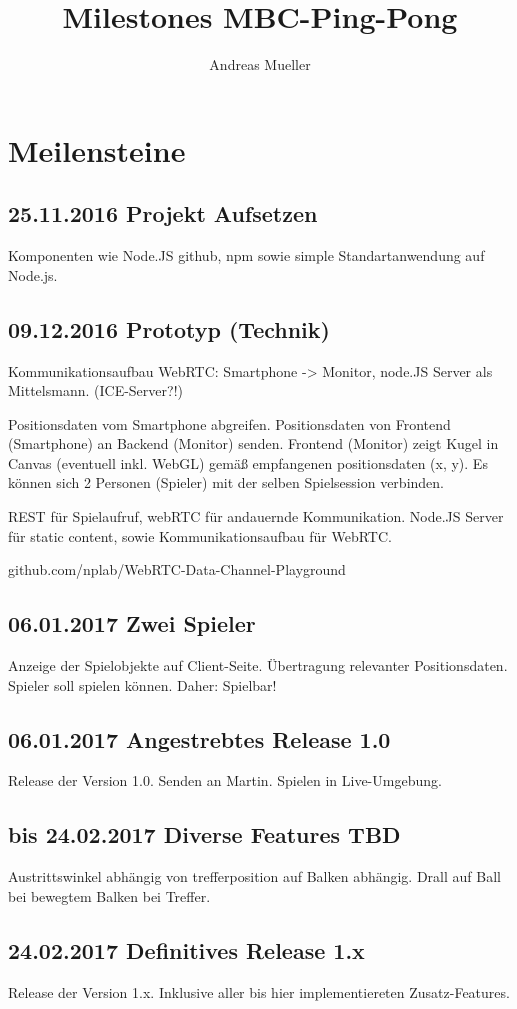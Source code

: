 \documentclass[12pt,a4paper]{article}
\author{Andreas Mueller}
\title{Milestones MBC-Ping-Pong}
\begin{document}
\maketitle
\newpage
\tableofcontents
\newpage

\section{Meilensteine}
\subsection{25.11.2016 Projekt Aufsetzen}
Komponenten wie Node.JS github, npm sowie simple Standartanwendung auf Node.js.

\subsection{09.12.2016 Prototyp (Technik)}
Kommunikationsaufbau WebRTC: Smartphone -> Monitor, node.JS Server als Mittelsmann. (ICE-Server?!)

Positionsdaten vom Smartphone abgreifen.
Positionsdaten von Frontend (Smartphone) an Backend (Monitor) senden.
Frontend (Monitor) zeigt Kugel in Canvas (eventuell inkl. WebGL) gemäß empfangenen positionsdaten (x, y).
Es können sich 2 Personen (Spieler) mit der selben Spielsession verbinden.

REST für Spielaufruf, webRTC für andauernde Kommunikation.
Node.JS Server für static content, 
sowie Kommunikationsaufbau für WebRTC.

github.com/nplab/WebRTC-Data-Channel-Playground

\subsection{06.01.2017 Zwei Spieler}
Anzeige der Spielobjekte auf Client-Seite. 
Übertragung relevanter Positionsdaten.
Spieler soll spielen können.
Daher: Spielbar!

\subsection{06.01.2017 Angestrebtes Release 1.0}
Release der Version 1.0.
Senden an Martin.
Spielen in Live-Umgebung.

\subsection{bis 24.02.2017 Diverse Features TBD}
Austrittswinkel abhängig von trefferposition auf Balken abhängig.
Drall auf Ball bei bewegtem Balken bei Treffer.

\subsection{24.02.2017 Definitives Release 1.x}
Release der Version 1.x.
Inklusive aller bis hier implementiereten Zusatz-Features.
\end{document}
